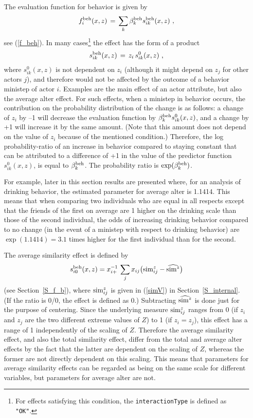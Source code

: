 \documentclass[a4paper,fleqn,11pt]{article}
\newcommand{\+}{\, + \,}
\newcommand{\vit}{\theenumi}
\begin{document}
The evaluation function for behavior is given by
\[
f^{\rm beh}_i(x, z) \, = \, \sum_k \beta^{\rm beh}_k s^{\rm beh}_{ik}(x, z) \ ,
\]
see (\ref{f_beh}).
In many cases\footnote{For effects satisfying this condition,
the \texttt{interactionType} is defined as \texttt{"OK"}.}
the effect has the form of a product
\begin{equation}
s^{\rm beh}_{ik}(x, z) \,=\, z_i \,s^{0}_{ik}(x, z) \ ,  \label{beh_generic}
\end{equation}
where $s^{0}_{ik}(x, z)$ is not dependent on $z_i$
(although it might depend on $z_j$ for other actors $j$), and therefore
would not be affected by the outcome of a behavior ministep of actor $i$.
Examples are the main effect of an actor attribute, but also the
average alter effect.
For such effects,
when a ministep in behavior occurs, the contribution
on the probability distribution of the change is as follows:
a change of $z_i $ by --1 will decrease the evaluation function by
$\beta^{\rm beh}_k s^{0}_{ik}(x, z)$,
and a change by +1 will increase it by the same amount.
(Note that this amount does not depend on the value of $z_i$
because of the mentioned condition.)
Therefore, the log probability-ratio of an increase in behavior compared to
staying constant that can be attributed to a difference of +1 in the
value of the predictor function $s^{0}_{ik}(x, z)$, is equal to
$\beta^{\rm beh}_k$. The probability ratio is $\exp(\beta^{\rm beh}_k)$.

For example, later in this section results are presented where,
for an analysis of drinking behavior, the
estimated parameter for average alter is 1.1414.
This means that when comparing two individuals who are equal in all respects
except that the friends of the first on average are  1 higher
on the drinking scale than those of the second individual,
the odds of increasing drinking behavior compared to no change
(in the event of a ministep with respect to drinking behavior)
are $\exp(1.1414) = 3.1$ times higher for the first individual
than for the second.
\medskip

The average similarity effect is defined by
\[ s^{\rm beh}_{i\vit}(x, z) = x_{i+}^{-1} \,
           \sum_j x_{ij} \big({\rm sim}^z_{ij} - \widehat{{\rm sim}^z}\big)
\]
(see Section~\ref{S_f_b}), where ${\rm sim}^z_{ij}$ is given in (\ref{simV})
in Section~\ref{S_internal}.
(If the ratio is 0/0, the effect is defined as 0.)
Subtracting $\widehat{{\rm sim}^z}$ is done just for the purpose
of centering.
Since the underlying measure ${\rm sim}^z_{ij}$ ranges from 0
(if $z_i$ and $z_j$ are the two different extreme values of $Z$)
to 1 (if $z_i = z_j$), this effect has a range of 1 independently
of the scaling of $Z$.
Therefore the average similarity effect, and also the total
similarity effect, differ from the total and average
alter effects by the fact that the latter are dependent on the scaling
of $Z$, whereas the former are not directly dependent on this scaling.
This means that parameters for average similarity effects can be regarded
as being on the same scale for different variables, but parameters
for average alter are not.
\medskip
\end{document}
